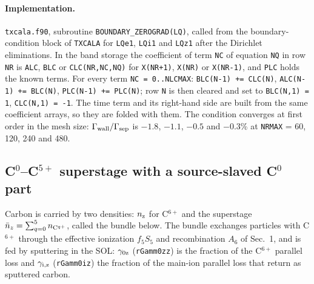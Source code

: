 \documentclass[11pt]{article}
\def\r#1{{\rm#1}}
\def\nz{n_\r{z}}
\def\nnz{\bar{n}_{z}}
\begin{document}
\paragraph{Implementation.}
\texttt{txcala.f90}, subroutine \texttt{BOUNDARY\_ZEROGRAD(LQ)}, called from the
boundary-condition block of \texttt{TXCALA} for \texttt{LQe1}, \texttt{LQi1} and
\texttt{LQz1} after the Dirichlet eliminations.  In the band storage the
coefficient of term \texttt{NC} of equation \texttt{NQ} in row \texttt{NR} is
\texttt{ALC}, \texttt{BLC} or \texttt{CLC}\texttt{(NR,NC,NQ)} for
\texttt{X(NR+1)}, \texttt{X(NR)} or \texttt{X(NR-1)}, and \texttt{PLC} holds the
known terms.  For every term \texttt{NC = 0..NLCMAX}:
\texttt{BLC(N-1)~+=~CLC(N)}, \texttt{ALC(N-1)~+=~BLC(N)},
\texttt{PLC(N-1)~+=~PLC(N)}; row \texttt{N} is then cleared and set to
\texttt{BLC(N,1) = 1}, \texttt{CLC(N,1) = -1}.  The time term and its
right-hand side are built from the same coefficient arrays, so they are folded
with them.  The condition converges at first order in the mesh size:
$\Gamma_\r{wall}/\Gamma_\r{sep}$ is $-1.8$, $-1.1$, $-0.5$ and $-0.3$\% at
\texttt{NRMAX} = 60, 120, 240 and 480.

\subsection{C$^0$--C$^{5+}$ superstage with a source-slaved C$^0$ part}

Carbon is carried by two densities: $\nz$ for C$^{6+}$ and the superstage
$\nnz = \sum_{q=0}^{5} n_{\r{C}^{q+}}$, called the bundle below.  The bundle
exchanges particles with C$^{6+}$ through the effective ionization $f_5S_5$
and recombination $A_6$ of Sec.~1, and is fed by sputtering in the SOL:
$\gamma_\r{0z}$ (\texttt{rGamm0zz}) is the fraction of the C$^{6+}$ parallel loss
and $\gamma_\r{i,z}$ (\texttt{rGamm0iz}) the fraction of the main-ion parallel
loss that return as sputtered carbon.
\end{document}
